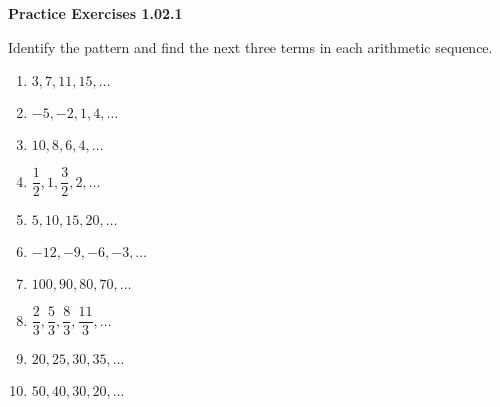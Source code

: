 \vspace{0.3ex}
\noindent\textbf{Practice Exercises 1.02.1}

\vspace{0.2ex}

Identify the pattern and find the next three terms in each arithmetic sequence.
\begin{multicols}{2}
\begin{enumerate}
    \item $3, 7, 11, 15, \dots$
    \item $-5, -2, 1, 4, \dots$
    \item $10, 8, 6, 4, \dots$
    \item $\dfrac{1}{2}, 1, \dfrac{3}{2}, 2, \dots$
    \item $5, 10, 15, 20, \dots$
    \item $-12, -9, -6, -3, \dots$
    \item $100, 90, 80, 70, \dots$
    \item $\dfrac{2}{3}, \dfrac{5}{3}, \dfrac{8}{3}, \dfrac{11}{3}, \dots$
    \item $20, 25, 30, 35, \dots$
    \item $50, 40, 30, 20, \dots$
    \end{enumerate}
    \end{multicols}
